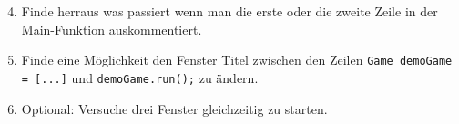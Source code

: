 \begin{enumerate}[label=\alph*)] \setcounter{enumi}{3}
    \item Finde herraus was passiert wenn man die erste oder die zweite Zeile in der Main-Funktion auskommentiert.
    \item Finde eine Möglichkeit den Fenster Titel zwischen den Zeilen \texttt{Game demoGame = [...]} und \texttt{demoGame.run();} zu ändern.
    \item Optional: Versuche drei Fenster gleichzeitig zu starten.
\end{enumerate}
